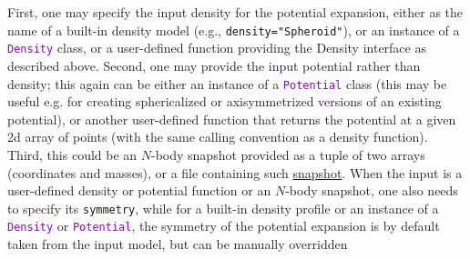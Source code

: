 \documentclass[12pt]{article}
\newcommand{\ttt}[1]{\textcolor{darkviolet}{\texttt{#1}}}
\newcommand{\ppp}[1]{\textcolor{darkolive} {\texttt{#1}}}
\begin{document}
First, one may specify the input density for the potential expansion, either as the name of a built-in density model (e.g., \ppp{density="Spheroid"}), or an instance of a \ttt{Density} class, or a user-defined function providing the Density interface as described above. Second, one may provide the input potential rather than density; this again can be either an instance of a \ttt{Potential} class (this may be useful e.g. for creating sphericalized or axisymmetrized versions of an existing potential), or another user-defined function that returns the potential at a given 2d array of points (with the same calling convention as a density function). Third, this could be an $N$-body snapshot provided as a tuple of two arrays (coordinates and masses), or a file containing such \hyperref[sec:PythonSnapshot]{snapshot}. When the input is a user-defined density or potential function or an $N$-body snapshot, one also needs to specify its \ppp{symmetry}, while for a built-in density profile or an instance of a \ttt{Density} or \ttt{Potential}, the symmetry of the potential expansion is by default taken from the input model, but can be manually overridden%
\end{document}
